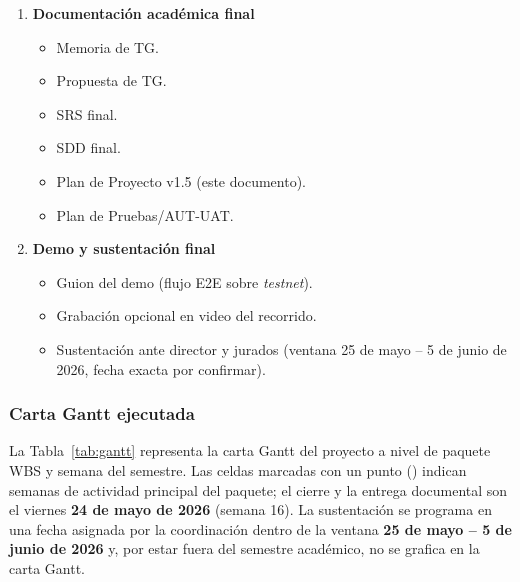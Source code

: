 \documentclass[12pt,oneside]{report}
\begin{document}
\begin{enumerate}[label=\textbf{1.\arabic*},leftmargin=*]
\begin{itemize}[label=$\circ$]
            \item Variables de entorno y secretos.
          \end{itemize}
        \item \textbf{Documentación académica final}
          \begin{itemize}[label=$\circ$]
            \item Memoria de TG.
            \item Propuesta de TG.
            \item SRS final.
            \item SDD final.
            \item Plan de Proyecto v1.5 (este documento).
            \item Plan de Pruebas/AUT-UAT.
          \end{itemize}
        \item \textbf{Demo y sustentación final}
          \begin{itemize}[label=$\circ$]
            \item Guion del demo (flujo E2E sobre \textit{testnet}).
            \item Grabación opcional en video del recorrido.
            \item Sustentación ante director y jurados (ventana 25 de mayo -- 5 de junio de 2026, fecha exacta por confirmar).
          \end{itemize}
      \end{enumerate}

      \subsubsection{Carta Gantt ejecutada}
      \label{subsubsec:gantt}
      La Tabla~\ref{tab:gantt} representa la carta Gantt del proyecto a nivel de paquete WBS y semana del semestre. Las celdas marcadas con un punto (\textbullet) indican semanas de actividad principal del paquete; el cierre y la entrega documental son el viernes \textbf{24 de mayo de 2026} (semana 16). La sustentación se programa en una fecha asignada por la coordinación dentro de la ventana \textbf{25 de mayo -- 5 de junio de 2026} y, por estar fuera del semestre académico, no se grafica en la carta Gantt.
\end{document}
